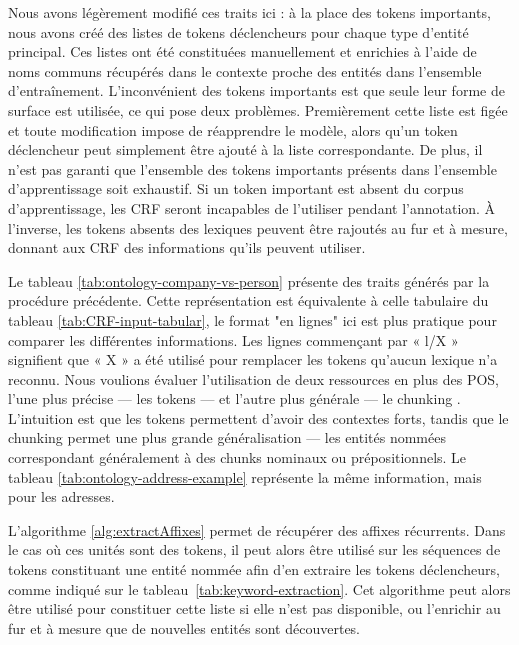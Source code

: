 \documentclass[12pt,a4paper,times,twoside,openright]{report}
\begin{document}
Nous avons légèrement modifié ces traits ici : à la place des tokens importants, nous avons créé des listes de tokens déclencheurs pour chaque type d'entité principal. Ces listes ont été constituées manuellement et enrichies à l'aide de noms communs récupérés dans le contexte proche des entités dans l'ensemble d'entraînement. L'inconvénient des tokens importants est que seule leur forme de surface est utilisée, ce qui pose deux problèmes. Premièrement cette liste est figée et toute modification impose de réapprendre le modèle, alors qu'un token déclencheur peut simplement être ajouté à la liste correspondante. De plus, il n'est pas garanti que l'ensemble des tokens importants présents dans l'ensemble d'apprentissage soit exhaustif. Si un token important est absent du corpus d'apprentissage, les CRF seront incapables de l'utiliser pendant l'annotation. À l'inverse, les tokens absents des lexiques peuvent être rajoutés au fur et à mesure, donnant aux CRF des informations qu'ils peuvent utiliser.

Le tableau \ref{tab:ontology-company-vs-person} présente des traits générés par la procédure précédente. Cette représentation est équivalente à celle tabulaire du tableau \ref{tab:CRF-input-tabular}, le format "en lignes" ici est plus pratique pour comparer les différentes informations. Les lignes commençant par « l/X » signifient que « X » a été utilisé pour remplacer les tokens qu'aucun lexique n'a reconnu. Nous voulions évaluer l'utilisation de deux ressources en plus des POS, l'une plus précise — les tokens — et l'autre plus générale — le chunking \citep{Abney91}. L'intuition est que les tokens permettent d'avoir des contextes forts, tandis que le chunking permet une plus grande généralisation — les entités nommées correspondant généralement à des chunks nominaux ou prépositionnels. Le tableau \ref{tab:ontology-address-example} représente la même information, mais pour les adresses.

L'algorithme \ref{alg:extractAffixes} permet de récupérer des affixes récurrents. Dans le cas où ces unités sont des tokens, il peut alors être utilisé sur les séquences de tokens constituant une entité nommée afin d'en extraire les tokens déclencheurs, comme indiqué sur le tableau\ \ref{tab:keyword-extraction}. Cet algorithme peut alors être utilisé pour constituer cette liste si elle n'est pas disponible, ou l'enrichir au fur et à mesure que de nouvelles entités sont découvertes.
\end{document}
